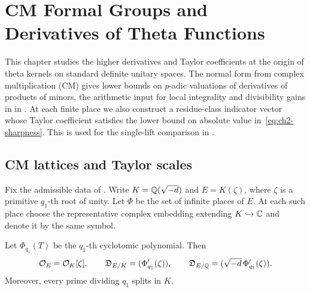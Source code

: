 \chapter{CM Formal Groups and Derivatives of Theta Functions}
\label{chap:derivatives}

\begin{chapterguide}
This chapter studies the higher derivatives and Taylor coefficients at the origin of theta kernels on standard definite unitary spaces. The normal form from complex multiplication (CM) gives lower bounds on $p$-adic valuations of derivatives of products of minors, the arithmetic input for local integrality and divisibility gains in  in . At each finite place we also construct a residue-class indicator vector whose Taylor coefficient satisfies the lower bound on absolute value in~\eqref{eq:ch2-sharpness}. This is used for the single-lift comparison in .
\end{chapterguide}

\section{CM lattices and Taylor scales}
\label{sec:ch2-cm-field}

Fix the admissible data of . Write $K=\mathbb{Q}(\sqrt{-d})$ and $E=K(\zeta)$, where $\zeta$ is a primitive $q_1$-th root of unity. Let $\Phi$ be the set of infinite places of $E$. At each such place choose the representative complex embedding extending $K\hookrightarrow\mathbb{C}$ and denote it by the same symbol.

\begin{proposition}
\label{prop:ch2-field-different}
Let $\Phi_{q_1}(T)$ be the $q_1$-th cyclotomic polynomial. Then
\begin{equation}
\label{eq:ch2-different}
 \mathcal{O}_E=\mathcal{O}_K[\zeta],\qquad
 \mathfrak D_{E/K}=(\Phi_{q_1}'(\zeta)),\qquad
 \mathfrak D_{E/\mathbb{Q}}=(\sqrt{-d}\,\Phi_{q_1}'(\zeta)).
\end{equation}
Moreover, every prime dividing $q_1$ splits in $K$.
\end{proposition}

